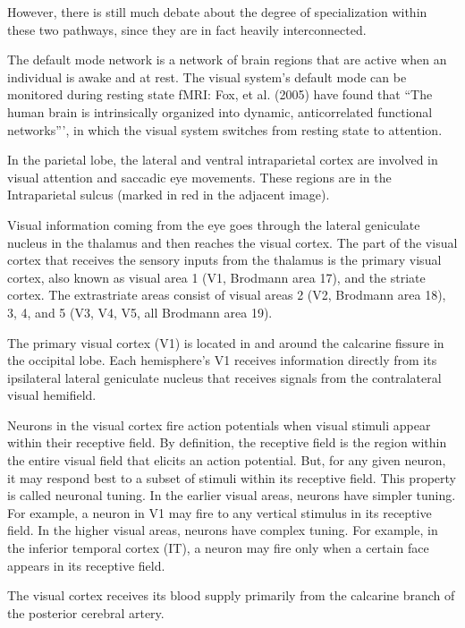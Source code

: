 However, there is still much debate about the degree of specialization within these two pathways, since they are in fact heavily interconnected.

The default mode network is a network of brain regions that are active when an individual is awake and at rest. The visual system's default mode can be monitored during resting state fMRI: Fox, et al. (2005) have found that ``The human brain is intrinsically organized into dynamic, anticorrelated functional networks''', in which the visual system switches from resting state to attention.

In the parietal lobe, the lateral and ventral intraparietal cortex are involved in visual attention and saccadic eye movements. These regions are in the Intraparietal sulcus (marked in red in the adjacent image).

Visual information coming from the eye goes through the lateral geniculate nucleus in the thalamus and then reaches the visual cortex. The part of the visual cortex that receives the sensory inputs from the thalamus is the primary visual cortex, also known as visual area 1 (V1, Brodmann area 17), and the striate cortex. The extrastriate areas consist of visual areas 2 (V2, Brodmann area 18), 3, 4, and 5 (V3, V4, V5, all Brodmann area 19).

The primary visual cortex (V1) is located in and around the calcarine fissure in the occipital lobe. Each hemisphere's V1 receives information directly from its ipsilateral lateral geniculate nucleus that receives signals from the contralateral visual hemifield.

Neurons in the visual cortex fire action potentials when visual stimuli appear within their receptive field. By definition, the receptive field is the region within the entire visual field that elicits an action potential. But, for any given neuron, it may respond best to a subset of stimuli within its receptive field. This property is called neuronal tuning. In the earlier visual areas, neurons have simpler tuning. For example, a neuron in V1 may fire to any vertical stimulus in its receptive field. In the higher visual areas, neurons have complex tuning. For example, in the inferior temporal cortex (IT), a neuron may fire only when a certain face appears in its receptive field.

The visual cortex receives its blood supply primarily from the calcarine branch of the posterior cerebral artery.

